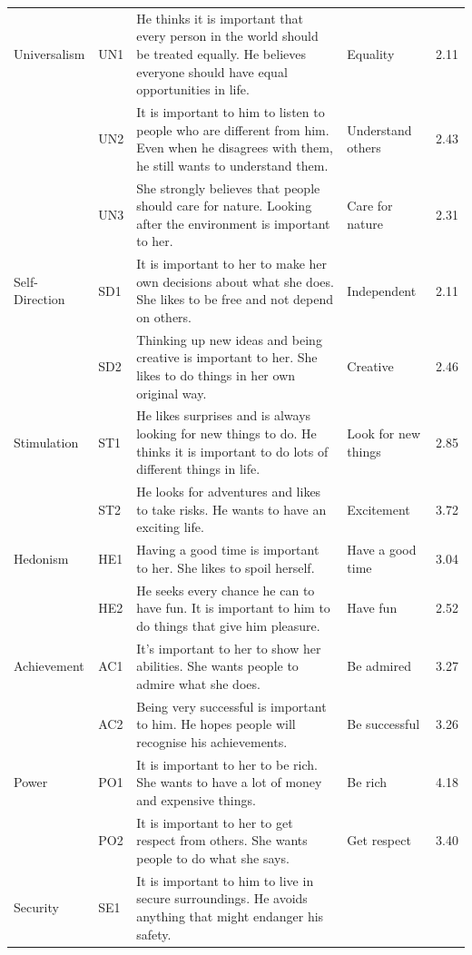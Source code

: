 \documentclass[12pt,letter]{article}\usepackage[]{graphicx}\usepackage[]{xcolor}
\begin{document}
\begin{table}
\begin{tabularx}{\linewidth}{llXlc}
Universalism & UN1 &  He thinks it is important that every person in the world should be treated equally. He believes everyone should have equal opportunities in life. 
    & Equality & 2.11 \\[0.5em]
 & UN2 & It is important to him to listen to people who are different from him. Even when he disagrees with them, he still wants to understand them.
    & Understand others & 2.43 \\[0.5em]
 & UN3 & She strongly believes that people should care for nature. Looking after the environment is important to her.
    & Care for nature & 2.31 \\[0.5em] \midrule
Self-Direction & SD1 & It is important to her to make her own decisions about what she does. She likes to be free and not depend on others.
    &   Independent & 2.11 \\[1em]
& SD2 & Thinking up new ideas and being creative is important to her. She likes to do things in her own original way. 
    &  Creative & 2.46 \\[0.5em] \midrule
Stimulation & ST1 & He likes surprises and is always looking for new things to do. He thinks it is important to do lots of different things in life.
    &  Look for new things & 2.85 \\[0.5em]
 & ST2 & He looks for adventures and likes to take risks. He wants to have an exciting life.
    &  Excitement & 3.72 \\[0.5em] \midrule
Hedonism & HE1 & Having a good time is important to her. She likes to spoil herself. &  Have a good time & 3.04 \\[0.5em] 
 & HE2 & He seeks every chance he can to have fun. It is important to him to do things that give him pleasure.
    &  Have fun & 2.52 \\[0.5em] \midrule
Achievement & AC1 & It's important to her to show her abilities. She wants people to admire what she does.
    &  Be admired & 3.27 \\[0.5em] 
 & AC2 & Being very successful is important to him. He hopes people will recognise his achievements.
    &  Be successful & 3.26 \\[0.5em] \midrule
Power & PO1 & It is important to her to be rich. She wants to have a lot of money and expensive things. 
    &  Be rich & 4.18 \\
 & PO2 & It is important to her to get respect from others. She wants people to do what she says.
    &  Get respect & 3.40 \\[0.5em] \midrule
Security & SE1 & It is important to him to live in secure surroundings. He avoids anything that might endanger his safety.

\end{tabularx}
\end{table}
\end{document}
